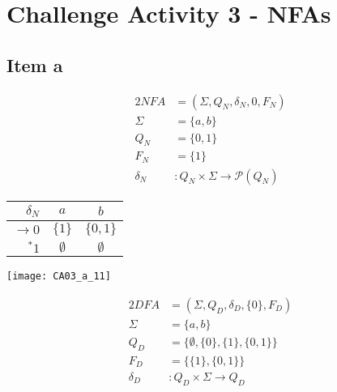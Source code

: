 \setcounter{section}{2}
\section{Challenge Activity 3 - NFAs}%
{
\renewcommand{\thesubsection}{\thesection.\alph{subsection}}
\subsection{Item a}
\begin{center}
	\begin{minipage}[c]{0.33\textwidth}
		\begin{alignat*}{2}
			NFA      &= (\Sigma, Q_N, \delta_N,0,F_N)\\
			\Sigma   &= \{a,b\}\\
			Q_N      &= \{0,1\}\\
			F_N      &= \{1\}\\
			\delta_N &\colon Q_N \times \Sigma \rightarrow \mathscr{P}(Q_N)		
		\end{alignat*}
	\end{minipage}%
	\begin{minipage}[c]{0.27\textwidth}
		\begin{tabular}{ r | c c }
			$\delta_N$ & $a$ & $b$ \\ \hline
			$\rightarrow 0$ & $\{1\}$ & $\{0,1\}$ \\
			$^\ast       1$ & $\emptyset$ & $\emptyset$
		\end{tabular}
	\end{minipage}%
	\begin{minipage}[c]{0.22\textwidth}
		\texttt{[image: CA03\_a\_11]}
	\end{minipage}
\end{center}
\begin{center}
	\begin{minipage}[c]{0.33\textwidth}
		\begin{alignat*}{2}
			DFA      &= (\Sigma, Q_D, \delta_D,\{0\},F_D)\\
			\Sigma   &= \{a,b\}\\
			Q_D      &= \{\emptyset, \{0\}, \{1\}, \{0,1\}\}\\
			F_D      &= \{\{1\}, \{0,1\}\}\\
			\delta_D &\colon Q_D \times \Sigma \rightarrow Q_D		
		\end{alignat*}
	\end{minipage}%
	\begin{minipage}[c]{0.28\textwidth}
		\begin{tabular}{ r | c c }

\end{tabular}
\end{minipage}
\end{center}}
